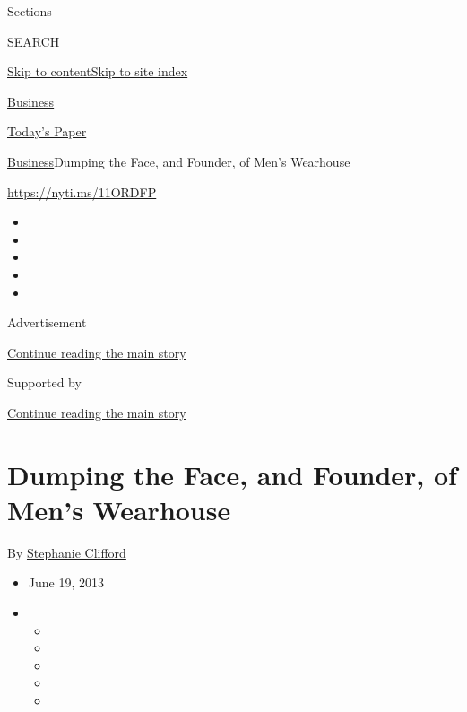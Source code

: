 Sections

SEARCH

\protect\hyperlink{site-content}{Skip to
content}\protect\hyperlink{site-index}{Skip to site index}

\href{https://www.nytimes3xbfgragh.onion/section/business}{Business}

\href{https://myaccount.nytimes3xbfgragh.onion/auth/login?response_type=cookie\&client_id=vi}{}

\href{https://www.nytimes3xbfgragh.onion/section/todayspaper}{Today's
Paper}

\href{/section/business}{Business}\textbar{}Dumping the Face, and
Founder, of Men's Wearhouse

\url{https://nyti.ms/11ORDFP}

\begin{itemize}
\item
\item
\item
\item
\item
\end{itemize}

Advertisement

\protect\hyperlink{after-top}{Continue reading the main story}

Supported by

\protect\hyperlink{after-sponsor}{Continue reading the main story}

\hypertarget{dumping-the-face-and-founder-of-mens-wearhouse}{%
\section{Dumping the Face, and Founder, of Men's
Wearhouse}\label{dumping-the-face-and-founder-of-mens-wearhouse}}

By
\href{https://www.nytimes3xbfgragh.onion/by/stephanie-clifford}{Stephanie
Clifford}

\begin{itemize}
\item
  June 19, 2013
\item
  \begin{itemize}
  \item
  \item
  \item
  \item
  \item
  \end{itemize}
\end{itemize}

